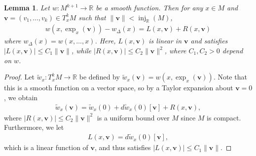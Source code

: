 \documentclass[11pt,reqno]{amsproc}
\numberwithin{equation}{section}
\newcommand{\R}{\mathbb{R}}
\newcommand{\bv}{\mathbf{v}}
\newcommand{\tw}{\tilde{w}}
\newcommand{\inj}{\operatorname{inj}}
\newtheorem{lemma}[counter]{Lemma}
\theoremstyle{definition}
\theoremstyle{plain}
\begin{document}
    \begin{lemma} \label{lem:smooth_localization}
        Let $w: M^{k+1} \to \R$ be a smooth function. Then for any $x \in M$ and $\bv = (v_1, \ldots, v_k) \in T^k_x M$ such that $\|\bv\| < \inj_\R(M)$, 
        \begin{align}
            w(x, \exp_x(\bv)) - w_\Delta(x) = L(x,\bv) + R(x,\bv)
        \end{align}
        where $w_\Delta(x) = w(x, \ldots, x)$. Here, $L(x,\bv)$ is linear in $\bv$ and satisfies $|L(x,\bv)| \leq C_1\|\bv\|$, while $|R(x,\bv)| \leq C_2 \|\bv\|^2$, where $C_1, C_2> 0$ depend on $w$. 
    \end{lemma}
    \begin{proof}
        Let $\tw_x: T^k_x M \to \R$ be defined by $\tw_x(\bv) = w(x, \exp_x(\bv))$. Note that this is a smooth function on a vector space, so by a Taylor expansion about $\bv = 0$, we obtain
        \begin{align}
            \tw_x(\bv) = \tw_x(0) + d\tw_x(0)[\bv] + R(x,\bv),
        \end{align}
        where $|R(x,\bv)| \leq C_2 \|\bv\|^2$ is a uniform bound over $M$ since $M$ is compact. Furthermore, we let
        \begin{align}
            L(x,\bv) = d\tw_x(0)[\bv],
        \end{align}
        which is a linear function of $\bv$, and thus satisfies $|L(x,\bv)| \leq C_1 \|\bv\|$. 
    \end{proof}
\end{document}
